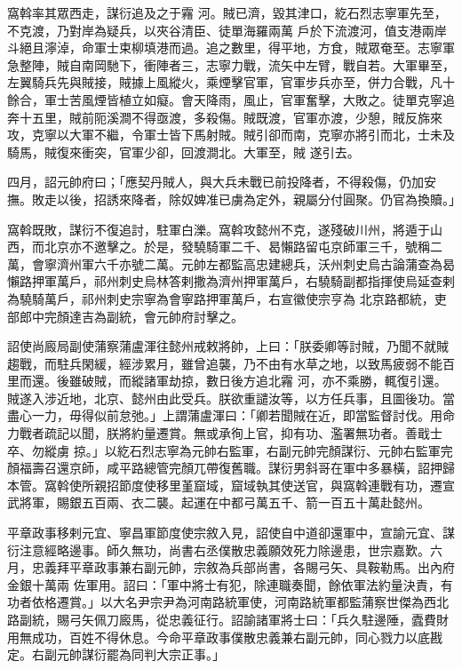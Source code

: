 \begin{pinyinscope}
窩斡率其眾西走，謀衍追及之于霿
 河。賊已濟，毀其津口，紇石烈志寧軍先至，不克渡，乃對岸為疑兵，以夾谷清臣、徒單海羅兩萬
 戶於下流渡河，值支港兩岸斗絕且濘淖，命軍士束柳填港而過。追之數里，得平地，方食，賊眾奄至。志寧軍急整陣，賊自南岡馳下，衝陣者三，志寧力戰，流矢中左臂，戰自若。大軍畢至，左翼騎兵先與賊接，賊據上風縱火，乘煙擊官軍，官軍步兵亦至，併力合戰，凡十餘合，軍士苦風煙皆植立如癡。會天降雨，風止，官軍奮擊，大敗之。徒單克寧追奔十五里，賊前阨溪澗不得亟渡，多殺傷。賊既渡，官軍亦渡，少憩，賊反旆來攻，克寧以大軍不繼，令軍士皆下馬射賊。賊引卻而南，克寧亦將引而北，士未及騎馬，賊復來衝突，官軍少卻，回渡澗北。大軍至，賊
 遂引去。



 四月，詔元帥府曰；「應契丹賊人，與大兵未戰已前投降者，不得殺傷，仍加安撫。敗走以後，招誘來降者，除奴婢准已虜為定外，親屬分付圓聚。仍官為換贖。」



 窩斡既敗，謀衍不復追討，駐軍白濼。窩斡攻懿州不克，遂殘破川州，將遁于山西，而北京亦不邀擊之。於是，發驍騎軍二千、曷懶路留屯京師軍三千，號稱二萬，會寧濟州軍六千亦號二萬。元帥左都監高忠建總兵，沃州刺史烏古論蒲查為曷懶路押軍萬戶，祁州刺史烏林答剌撒為濟州押軍萬戶，右驍騎副都指揮使烏延查剌為驍騎萬戶，祁州刺史宗寧為會寧路押軍萬戶，右宣徽使宗亨為
 北京路都統，吏部郎中完顏達吉為副統，會元帥府討擊之。


詔使尚廄局副使蒲察蒲盧渾往懿州戒敕將帥，上曰：「朕委卿等討賊，乃聞不就賊趨戰，而駐兵閑緩，經涉累月，雖曾追襲，乃不由有水草之地，以致馬疲弱不能百里而還。後雖破賊，而縱諸軍劫掠，數日後方追北霿
 河，亦不乘勝，輒復引還。賊遂入涉近地，北京、懿州由此受兵。朕欲重譴汝等，以方任兵事，且圖後功。當盡心一力，毋得似前怠弛。」上謂蒲盧渾曰：「卿若聞賊在近，即當監督討伐。用命力戰者疏記以聞，朕將約量遷賞。無或承徇上官，抑有功、濫署無功者。善戢士卒、勿縱虜
 掠。」以紇石烈志寧為元帥右監軍，右副元帥完顏謀衍、元帥右監軍完顏福壽召還京師，咸平路總管完顏兀帶復舊職。謀衍男斜哥在軍中多暴橫，詔押歸本管。窩斡使所親招節度使移里堇窟域，窟域執其使送官，與窩斡連戰有功，遷宣武將軍，賜銀五百兩、衣二襲。起運在中都弓萬五千、箭一百五十萬赴懿州。



 平章政事移剌元宜、寧昌軍節度使宗敘入見，詔使自中道卻還軍中，宣諭元宜、謀衍注意經略邊事。師久無功，尚書右丞僕散忠義願效死力除邊患，世宗嘉歎。六月，忠義拜平章政事兼右副元帥，宗敘為兵部尚書，各賜弓矢、具鞍勒馬。出內府金銀十萬兩
 佐軍用。詔曰：「軍中將士有犯，除連職奏聞，餘依軍法約量決責，有功者依格遷賞。」以大名尹宗尹為河南路統軍使，河南路統軍都監蒲察世傑為西北路副統，賜弓矢佩刀廄馬，從忠義征行。詔諭諸軍將士曰：「兵久駐邊陲，蠹費財用無成功，百姓不得休息。今命平章政事僕散忠義兼右副元帥，同心戮力以底戡定。右副元帥謀衍罷為同判大宗正事。」




\end{pinyinscope}
